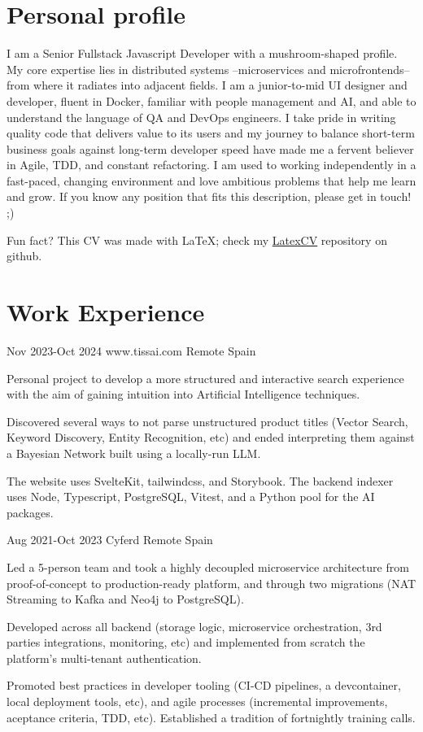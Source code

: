\documentclass[10pt]{CurriculumVitae}
\begin{document}
  \makeheading

  \section{Personal profile}
    {
      I am a Senior Fullstack Javascript Developer with a mushroom-shaped profile.
      My core expertise lies in distributed systems –microservices and microfrontends– from where it radiates into adjacent fields. I am a junior-to-mid UI designer and developer, fluent in Docker, familiar with people management and AI, and able to understand the language of QA and DevOps engineers.
      I take pride in writing quality code that delivers value to its users and my journey to balance short-term business goals against long-term developer speed have made me a fervent believer in Agile, TDD, and constant refactoring.
      I am used to working independently in a fast-paced, changing environment and love ambitious problems that help me learn and grow.
      If you know any position that fits this description, please get in touch! ;) 
      
      \null\hfill {\scriptsize Fun fact? This CV was made with LaTeX; check my \href{https://github.com/antsago/LatexCV}{LatexCV} repository on github.}
    }


  \section{Work Experience}

      {Nov 2023-Oct 2024}
      {www.tissai.com}
      {Remote}
      {Spain}
      {
        \item Personal project to develop a more structured and interactive search experience with the aim of gaining intuition into Artificial Intelligence techniques.
        \item Discovered several ways to not parse unstructured product titles (Vector Search, Keyword Discovery, Entity Recognition, etc) and ended interpreting them against a Bayesian Network built using a locally-run LLM.
        \item The website uses SvelteKit, tailwindcss, and Storybook. The backend indexer uses Node, Typescript, PostgreSQL, Vitest, and a Python pool for the AI packages.
      }

      {Aug 2021-Oct 2023}
      {Cyferd}
      {Remote}
      {Spain}
      {
        \item Led a 5-person team and took a highly decoupled microservice architecture from proof-of-concept to production-ready platform, and through two migrations (NAT Streaming to Kafka and Neo4j to PostgreSQL).
        \item Developed across all backend (storage logic, microservice orchestration, 3rd parties integrations, monitoring, etc) and implemented from scratch the platform's multi-tenant authentication.
        \item Promoted best practices in developer tooling (CI-CD pipelines, a devcontainer, local deployment tools, etc), and agile processes (incremental improvements, aceptance criteria, TDD, etc). Established a tradition of fortnightly training calls.
      }
\end{document}
